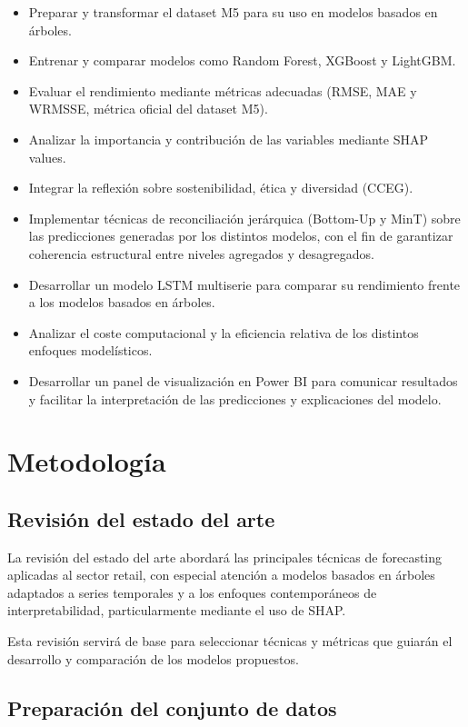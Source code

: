 \documentclass[IB,BIB]{TFUOC}%
\begin{document}
\begin{itemize}
\item
  Preparar y transformar el dataset M5 para su uso en modelos basados en
  árboles.
\item
  Entrenar y comparar modelos como Random Forest, XGBoost y LightGBM.
\item
  Evaluar el rendimiento mediante métricas adecuadas (RMSE, MAE y
  WRMSSE, métrica oficial del dataset M5).
\item
  Analizar la importancia y contribución de las variables mediante SHAP
  values.
\item
  Integrar la reflexión sobre sostenibilidad, ética y diversidad (CCEG).
\item
  Implementar técnicas de reconciliación jerárquica (Bottom-Up y MinT)
  sobre las predicciones generadas por los distintos modelos, con el fin
  de garantizar coherencia estructural entre niveles agregados y
  desagregados.
\item
  Desarrollar un modelo LSTM multiserie para comparar su rendimiento
  frente a los modelos basados en árboles.
\item
  Analizar el coste computacional y la eficiencia relativa de los
  distintos enfoques modelísticos.
\item
  Desarrollar un panel de visualización en Power BI para comunicar
  resultados y facilitar la interpretación de las predicciones y
  explicaciones del modelo.
\end{itemize}

\newpage
\section{Metodología}

\subsection{Revisión del estado del arte}

La revisión del estado del arte abordará las principales técnicas de
forecasting aplicadas al sector retail, con especial atención a modelos
basados en árboles adaptados a series temporales y a los enfoques
contemporáneos de interpretabilidad, particularmente mediante el uso de
SHAP.

Esta revisión servirá de base para seleccionar técnicas y métricas que
guiarán el desarrollo y comparación de los modelos propuestos.

\subsection{Preparación del conjunto de datos}
\end{document}
